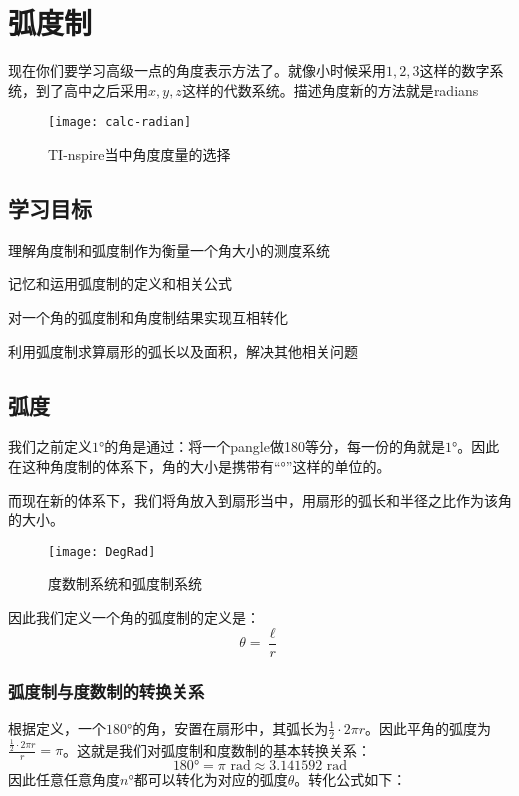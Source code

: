 \chapter{弧度制}
\label{ch:Circular Measure}
现在你们要学习高级一点的角度表示方法了。就像小时候采用$1,2,3$这样的数字系统，到了高中之后采用$x,y,z$这样的代数系统。描述角度新的方法就是\gls{radians}
\begin{figure}[H]
\centering
\texttt{[image: calc-radian]}
\caption{TI-nspire当中角度度量的选择}
\end{figure}


\section*{学习目标}
\begin{todolist}
 \item 理解角度制和弧度制作为衡量一个角大小的测度系统
 \item 记忆和运用弧度制的定义和相关公式
 \item 对一个角的弧度制和角度制结果实现互相转化
 \item 利用弧度制求算扇形的弧长以及面积，解决其他相关问题
\end{todolist}
\clearpage


\section{弧度}
\label{sec:Radian}
我们之前定义$1$\si{\degree}的角是通过：将一个\gls{pangle}做180等分，每一份的角就是$1$\si{\degree}。因此在这种角度制的体系下，角的大小是携带有``\si{\degree}''这样的单位的。

而现在新的体系下，我们将角放入到扇形当中，用扇形的弧长和半径之比作为该角的大小。
\begin{figure}[H]
\centering
\texttt{[image: DegRad]} 
\caption{度数制系统和弧度制系统}
\end{figure}

因此我们定义一个角的弧度制的定义是：
\[
	\theta=\frac{\ell}{r}
\]

\subsection*{弧度制与度数制的转换关系}
\label{subsec: Convertion between Radians and Degrees}
根据定义，一个$180$\si{\degree}的角，安置在扇形中，其弧长为$\frac{1}{2}\cdot 2\pi r$。因此平角的弧度为$\frac{\frac{1}{2}\cdot 2\pi r}{r}=\pi$。这就是我们对弧度制和度数制的基本转换关系：
\[
	180\si{\degree} = \pi \text{ rad} \approx 3.141592 \text{ rad}
\]
因此任意任意角度$n$\si{\degree}都可以转化为对应的弧度$\theta$。转化公式如下：

